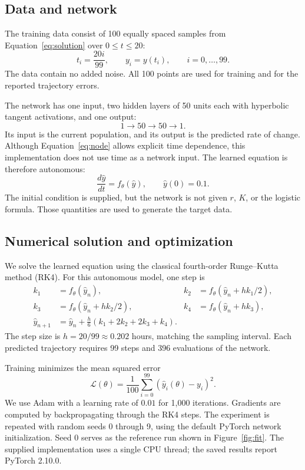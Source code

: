 \documentclass[11pt]{article}
\begin{document}
\subsection{Data and network}

The training data consist of 100 equally spaced samples from
Equation~\eqref{eq:solution} over $0\le t\le20$:
\[
 t_i=\frac{20i}{99},\qquad y_i=y(t_i),\qquad i=0,\ldots,99.
\]
The data contain no added noise. All 100 points are used for training and for
the reported trajectory errors.

The network has one input, two hidden layers of 50 units each with hyperbolic
tangent activations, and one output:
\[
 1\longrightarrow50\longrightarrow50\longrightarrow1.
\]
Its input is the current population, and its output is the predicted rate of
change. Although Equation~\eqref{eq:node} allows explicit time dependence,
this implementation does not use time as a network input. The learned equation
is therefore autonomous:
\[
 \frac{d\hat y}{dt}=f_\theta(\hat y),\qquad \hat y(0)=0.1.
\]
The initial condition is supplied, but the network is not given $r$, $K$, or
the logistic formula. Those quantities are used to generate the target data.

\subsection{Numerical solution and optimization}

We solve the learned equation using the classical fourth-order Runge--Kutta
method (RK4). For this autonomous model, one step is
\begin{align*}
 k_1&=f_\theta(\hat y_n),&
 k_2&=f_\theta(\hat y_n+hk_1/2),\\
 k_3&=f_\theta(\hat y_n+hk_2/2),&
 k_4&=f_\theta(\hat y_n+hk_3),\\
 \hat y_{n+1}&=\hat y_n+\frac{h}{6}(k_1+2k_2+2k_3+k_4).
\end{align*}
The step size is $h=20/99\approx0.202$ hours, matching the sampling interval.
Each predicted trajectory requires 99 steps and 396 evaluations of the network.

Training minimizes the mean squared error
\begin{equation}
 \mathcal L(\theta)=\frac{1}{100}\sum_{i=0}^{99}
 \left(\hat y_i(\theta)-y_i\right)^2.
 \label{eq:loss}
\end{equation}
We use Adam \cite{kingma2015adam} with a learning rate of $0.01$ for 1,000
iterations. Gradients are computed by backpropagating through the RK4 steps.
The experiment is repeated with random seeds 0 through 9, using the default
PyTorch network initialization. Seed 0 serves as the reference run shown in
Figure~\ref{fig:fit}. The supplied implementation uses a single CPU thread;
the saved results report PyTorch 2.10.0.
\end{document}
